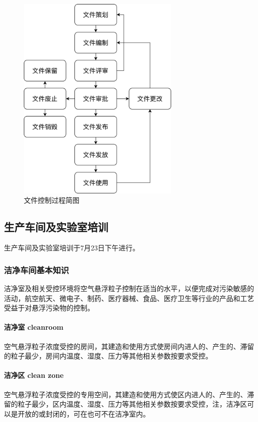 \documentclass[cn,black,12pt,normal]{elegantnote}
\begin{document}
\begin{figure}[H]
    \centering
    \includegraphics[width=0.7\textwidth]{image/DocumentControl.png}
    \caption{文件控制过程简图}
    \label{FC}
\end{figure}

\subsection{生产车间及实验室培训}
生产车间及实验室培训于7月23日下午进行。

\subsubsection{洁净车间基本知识}
洁净室及相关受控环境将空气悬浮粒子控制在适当的水平，以便完成对污染敏感的活动，航空航天、微电子、制药、医疗器械、食品、医疗卫生等行业的产品和工艺受益于对悬浮污染物的控制。

\paragraph{洁净室 cleanroom} 空气悬浮粒子浓度受控的房间，其建造和使用方式使房间内进人的、产生的、滞留的粒子最少，房间内温度、湿度、压力等其他相关参数按要求受控。

\paragraph{洁净区 clean zone} 空气悬浮粒子浓度受控的专用空间，其建造和使用方式使区内进人的、产生的、滞留的粒子最少，区内温度、湿度、压力等其他相关参数按要求受控，注，洁净区可以是开放的或封闭的，可在也可不在洁净室内。
\end{document}
